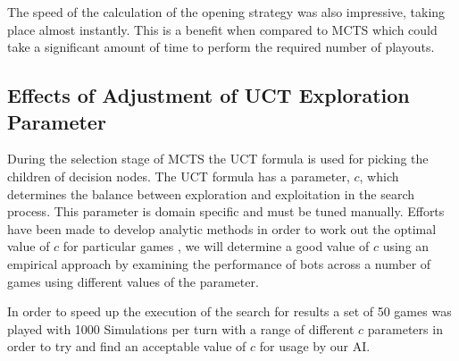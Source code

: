 \documentclass[]{article}
\begin{document}
\par The speed of the calculation of the opening strategy was also impressive, taking place almost instantly. This is a benefit when compared to MCTS which could take a significant amount of time to perform the required number of playouts.

\subsection{Effects of Adjustment of UCT Exploration Parameter}

During the selection stage of MCTS the UCT formula is used for picking the children of decision nodes. The UCT formula has a parameter, $c$, which determines the balance between exploration and exploitation in the search process. This parameter is domain specific and must be tuned manually. Efforts have been made to develop analytic methods in order to work out the optimal value of $c$ for particular games \autocite{chaslot2008cross, kozelek2009methods}, we will determine a good value of $c$ using an empirical approach by examining the performance of bots across a number of games using different values of the parameter.

\par In order to speed up the execution of the search for results a set of 50 games was played with 1000 Simulations per turn with a range of different $c$ parameters in order to try and find an acceptable value of $c$ for usage by our AI.
\end{document}
